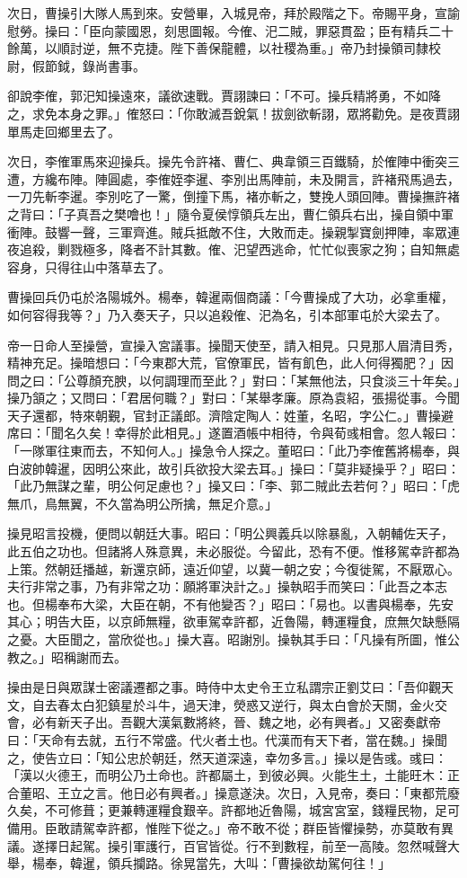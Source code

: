 次日，曹操引大隊人馬到來。安營畢，入城見帝，拜於殿階之下。帝賜平身，宣諭慰勞。操曰：「臣向蒙國恩，刻思圖報。今傕、汜二賊，罪惡貫盈；臣有精兵二十餘萬，以順討逆，無不克捷。陛下善保龍體，以社稷為重。」帝乃封操領司隸校尉，假節鉞，錄尚書事。

卻說李傕，郭汜知操遠來，議欲速戰。賈詡諫曰：「不可。操兵精將勇，不如降之，求免本身之罪。」傕怒曰：「你敢滅吾銳氣！拔劍欲斬詡，眾將勸免。是夜賈詡單馬走回鄉里去了。

次日，李傕軍馬來迎操兵。操先令許褚、曹仁、典韋領三百鐵騎，於傕陣中衝突三遭，方纔布陣。陣圓處，李傕姪李暹、李別出馬陣前，未及開言，許褚飛馬過去，一刀先斬李暹。李別吃了一驚，倒撞下馬，褚亦斬之，雙挽人頭回陣。曹操撫許褚之背曰：「子真吾之樊噲也！」隨令夏侯惇領兵左出，曹仁領兵右出，操自領中軍衝陣。鼓響一聲，三軍齊進。賊兵抵敵不住，大敗而走。操親掣寶劍押陣，率眾連夜追殺，剿戮極多，降者不計其數。傕、汜望西逃命，忙忙似喪家之狗；自知無處容身，只得往山中落草去了。

曹操回兵仍屯於洛陽城外。楊奉，韓暹兩個商議：「今曹操成了大功，必拿重權，如何容得我等？」乃入奏天子，只以追殺傕、汜為名，引本部軍屯於大梁去了。

帝一日命人至操營，宣操入宮議事。操聞天使至，請入相見。只見那人眉清目秀，精神充足。操暗想曰：「今東郡大荒，官僚軍民，皆有飢色，此人何得獨肥？」因問之曰：「公尊顏充腴，以何調理而至此？」對曰：「某無他法，只食淡三十年矣。」操乃頷之；又問曰：「君居何職？」對曰：「某舉孝廉。原為袁紹，張揚從事。今聞天子還都，特來朝覲，官封正議郎。濟陰定陶人：姓董，名昭，字公仁。」曹操避席曰：「聞名久矣！幸得於此相見。」遂置酒帳中相待，令與荀彧相會。忽人報曰：「一隊軍往東而去，不知何人。」操急令人探之。董昭曰：「此乃李傕舊將楊奉，與白波帥韓暹，因明公來此，故引兵欲投大梁去耳。」操曰：「莫非疑操乎？」昭曰：「此乃無謀之輩，明公何足慮也？」操又曰：「李、郭二賊此去若何？」昭曰：「虎無爪，鳥無翼，不久當為明公所擒，無足介意。」

操見昭言投機，便問以朝廷大事。昭曰：「明公興義兵以除暴亂，入朝輔佐天子，此五伯之功也。但諸將人殊意異，未必服從。今留此，恐有不便。惟移駕幸許都為上策。然朝廷播越，新還京師，遠近仰望，以冀一朝之安；今復徙駕，不厭眾心。夫行非常之事，乃有非常之功：願將軍決計之。」操執昭手而笑曰：「此吾之本志也。但楊奉布大梁，大臣在朝，不有他變否？」昭曰：「易也。以書與楊奉，先安其心；明告大臣，以京師無糧，欲車駕幸許都，近魯陽，轉運糧食，庶無欠缺懸隔之憂。大臣聞之，當欣從也。」操大喜。昭謝別。操執其手曰：「凡操有所圖，惟公教之。」昭稱謝而去。

操由是日與眾謀士密議遷都之事。時侍中太史令王立私謂宗正劉艾曰：「吾仰觀天文，自去春太白犯鎮星於斗牛，過天津，熒惑又逆行，與太白會於天關，金火交會，必有新天子出。吾觀大漢氣數將終，晉、魏之地，必有興者。」又密奏獻帝曰：「天命有去就，五行不常盛。代火者土也。代漢而有天下者，當在魏。」操聞之，使告立曰：「知公忠於朝廷，然天道深遠，幸勿多言。」操以是告彧。彧曰：「漢以火德王，而明公乃土命也。許都屬土，到彼必興。火能生土，土能旺木：正合董昭、王立之言。他日必有興者。」操意遂決。次日，入見帝，奏曰：「東都荒廢久矣，不可修葺；更兼轉運糧食艱辛。許都地近魯陽，城宮宮室，錢糧民物，足可備用。臣敢請駕幸許都，惟陛下從之。」帝不敢不從；群臣皆懼操勢，亦莫敢有異議。遂擇日起駕。操引軍護行，百官皆從。行不到數程，前至一高陵。忽然喊聲大舉，楊奉，韓暹，領兵攔路。徐晃當先，大叫：「曹操欲劫駕何往！」

